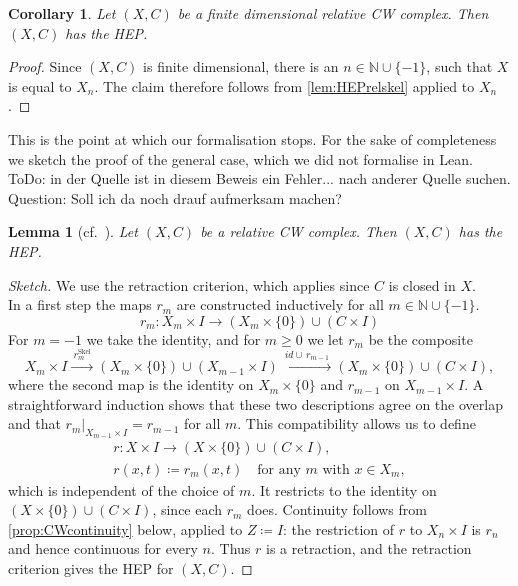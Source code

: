 \documentclass[11pt, a4paper, english]{article}
\newcommand{\restrict}[2]{\left.#1\right|_{#2}}
\theoremstyle{plain}
\newtheorem{lemma}[theorem]{Lemma}
\newtheorem{corollary}[theorem]{Corollary}
\theoremstyle{definition}
\theoremstyle{remark}
\numberwithin{equation}{section}
\numberwithin{theorem}{section}
\begin{document}
\begin{corollary} \label{cor:HEPfiniteCW}
    Let $(X,C)$ be a finite dimensional relative CW complex. Then $(X,C)$ has the HEP.
\end{corollary}

\begin{proof}
    Since $(X,C)$ is finite dimensional, there is an $n \in \mathbb{N} \cup \{-1\}$, such that $X$ is equal to $X_n$. The claim therefore follows from \cref{lem:HEPrelskel} applied to $X_n$.
\end{proof}

This is the point at which our formalisation stops. For the sake of completeness we sketch the proof of the general case, which we did not formalise in Lean.
ToDo: in der Quelle ist in diesem Beweis ein Fehler... nach anderer Quelle suchen. Question: Soll ich da noch drauf aufmerksam machen?
\begin{lemma}  [cf.\ {\cite[page 40 f.]{WAL}}] \label{HEP_CW}
    Let $(X,C)$ be a relative CW complex. Then $(X,C)$ has the HEP.
\end{lemma}

\begin{proof}[Sketch]
    We use the retraction criterion, which applies since $C$ is closed in $X$. \\
    In a first step the maps $r_m$ are constructed inductively for all $m \in \mathbb{N} \cup \{-1\}$. 
    \[
        r_m \colon X_m \times I \to (X_m \times \{0\}) \cup (C \times I)
    \]
    For $m = -1$ we take the identity, and for $m \ge 0$ we let $r_m$ be the composite
    \[
        X_m \times I \xrightarrow{\ r^{\mathrm{Skel}}_m\ }
        (X_m \times \{0\}) \cup (X_{m-1} \times I)
        \xrightarrow{\ id \cup\, r_{m-1}\ }
        (X_m \times \{0\}) \cup (C \times I) ,
    \]
    where the second map is the identity on $X_m \times \{0\}$ and $r_{m-1}$ on $X_{m-1} \times I$. A straightforward induction shows that these two descriptions agree on the overlap and that $\restrict{r_m}{X_{m-1} \times I} = r_{m-1}$ for all $m$. This compatibility allows us to define
    \begin{align*}
        r \colon X \times I \to (X \times \{0\}) \cup (C \times I), \qquad \\
        r(x,t) \coloneqq r_m(x,t) \quad \text{for any } m \text{ with } x \in X_m ,
    \end{align*}  
    which is independent of the choice of $m$. It restricts to the identity on $(X \times \{0\}) \cup (C \times I)$, since each $r_m$ does. Continuity follows from \cref{prop:CWcontinuity} below, applied to $Z \coloneqq I$: the restriction of $r$ to $X_n \times I$ is $r_n$ and hence continuous for every $n$. Thus $r$ is a retraction, and the retraction criterion gives the HEP for $(X,C)$.
\end{proof}
\end{document}
